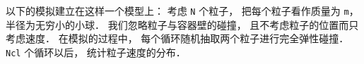 
以下的模拟建立在这样一个模型上： 考虑 \verb|N| 个粒子， 把每个粒子看作质量为 \verb|m|， 半径为无穷小的小球． 我们忽略粒子与容器壁的碰撞， 且不考虑粒子的位置而只考虑速度． 在模拟的过程中， 每个循环随机抽取两个粒子进行完全弹性碰撞． \verb|Ncl| 个循环以后， 统计粒子速度的分布．
